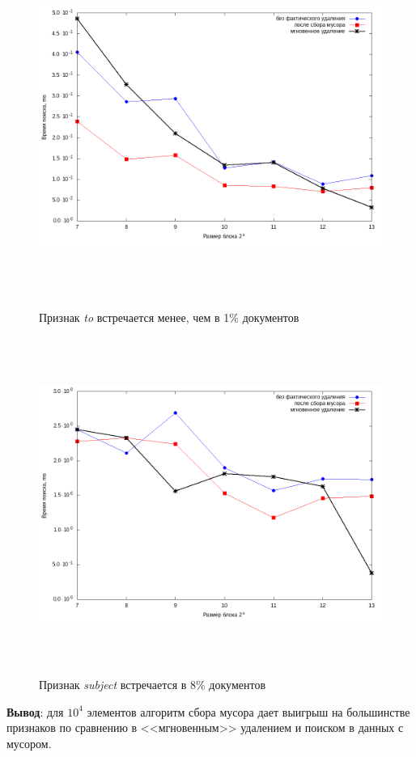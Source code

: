\begin{figure}[H]
\includegraphics[width=\linewidth, height=11cm]{fig/limit_1e6/1e4/to.png}
\caption{Признак \textit{to} встречается менее, чем в 1\% документов}
\includegraphics[width=\linewidth, height=11cm]{fig/limit_1e6/1e4/subject.png}
\caption{Признак \textit{subject} встречается в 8\% документов}
\end{figure}

\textbf{Вывод}: для $10^4$ элементов алгоритм сбора мусора дает выигрыш на большинстве признаков
по сравнению в <<мгновенным>> удалением и поиском в данных с мусором.

